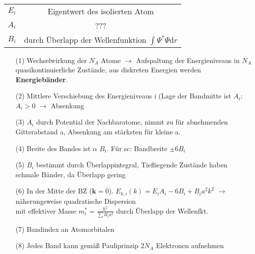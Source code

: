 \begin{itemize}
\begin{itemize}
\begin{align*}
        \end{align*}
        \begin{table}[H]
            \begin{tabular}{cc}
                $E_i$ & Eigentwert des isolierten Atom\\
                $A_i$ & ??? \\
                $B_i$ & durch Überlapp der Wellenfunktion $\int \Psi^* \Psi \mathrm{d}r$
            \end{tabular}
        \end{table}
        \begin{itemize}
            \item[(1)] Wechselwirkung der  $N_A$ Atome $\rightarrow$ Aufspaltung der Energieniveaus in $N_A$ quasikontinuierliche Zustände, aus diskreten Energien werden \textbf{Energiebänder}.
            \item[(2)] Mittlere Verschiebung des Energieniveaus i (Lage der Bandmitte ist $A_i$: $A_i > 0$ $\rightarrow$ Absenkung
            \item[(3)] $A_i$ durch Potential der Nachbaratome, nimmt zu für abnehmenden Gitterabstand a, Absenkung am stärksten für kleine a.
            \item[(4)] Breite des Bandes ist $\alpha$ $B_i$. Für sc: Bandbreite $\pm 6 B_i$
            \item[(5)] $B_i$ bestimmt durch Überlappintegral, Tiefliegende Zustände haben schmale Bänder, da Überlapp gering
            \item[(6)] In der Mitte der BZ ($\textbf{k} = 0$). $E_{k,i} (k) = E_i A_i - 6 B_i + B_i a^2k^2$
            $\rightarrow$ näherungsweise quadratische Dispersion\\
            mit effektiver Masse $m_i^* = \frac{\hbar^2}{\sum B_i a^2}$ durch Überlapp der Wellenfkt.
            \item[(7)] Bandindex an Atomorbitalen
            \item[(8)] Jedes Band kann gemäß Pauliprinzip $2N_A$ Elektronen aufnehmen 
        \end{itemize}
    \end{itemize}
\end{itemize}
